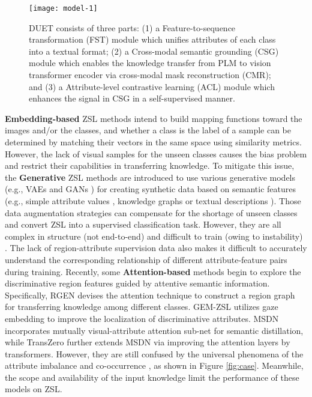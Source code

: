 \documentclass[letterpaper]{article} \usepackage{aaai23}  \usepackage{times}  \usepackage{helvet}  \usepackage{courier}  \usepackage[hyphens]{url}  \usepackage{graphicx} \urlstyle{rm} \def\UrlFont{\rm}  \usepackage{natbib}  \usepackage{caption} \frenchspacing  \setlength{\pdfpagewidth}{8.5in}  \setlength{\pdfpageheight}{11in}  \usepackage{algorithm}
\newcommand{\wen}[1]{{\color{black}#1}}
\newcommand{\fy}[1]{{\color{black}#1}}
\begin{document}
\begin{figure*}[!htbp]
\vspace{-2pt}
  \centering
  \texttt{[image: model-1]}
  \vspace{-2pt}
  \caption{
  \wen{DUET consists of three parts: (1) {a} {{Feature-to-sequence transformation (FST) module}} which unifies 
attributes of each class 
into a textual format; 
(2) {a} {{Cross-modal semantic grounding (CSG) module}} which enables the knowledge transfer from PLM to vision transformer encoder via cross-modal mask reconstruction (CMR);
and (3) a {{Attribute-level contrastive learning (ACL) module}} which enhances the signal in CSG in a self-supervised manner.}}
  \vspace{-10pt}
  \label{fig:model}
\end{figure*}
\textbf{Embedding-based} \wen{ZSL}
methods \cite{DBLP:conf/nips/FromeCSBDRM13} \fy{intend} to build mapping functions toward the images and/or the classes, 
and whether a class is the label of a sample can be determined by matching their vectors in the same space using similarity metrics.
However, the lack of visual samples for the unseen classes causes the bias problem and restrict their capabilities in transferring knowledge. 
To mitigate this issue, the  \textbf{Generative} ZSL methods \cite{Chen2021HSVA,DBLP:conf/iccv/0002WXPYZ021,DBLP:conf/www/GengC0PYYJC21} are introduced to use  various generative models (e.g., VAEs and GANs ) for creating synthetic data based on semantic features (e.g., simple attribute values \cite{DBLP:conf/cvpr/NaeemXTA21}, knowledge graphs \cite{PVGW2017,DBLP:conf/www/GengC0PYYJC21} or textual descriptions \cite{DBLP:conf/mir/ChenY21}). 
Those data augmentation strategies can compensate for the shortage of unseen classes and convert ZSL into a supervised classiﬁcation task. 
However, they are all complex in structure (not end-to-end) and difficult to train (owing to instability) \cite{DBLP:journals/corr/abs-2011-08641}.
\fy{The lack of} region-attribute supervision data also makes it difficult to accurately understand the corresponding relationship of different attribute-feature pairs during training. 
Recently, some \textbf{Attention-based} methods begin to explore the discriminative region features \fy{guided by} attentive semantic information.
Specifically, 
RGEN  \cite{DBLP:conf/eccv/Xie0ZZZYQ020} \fy{devises} the attention technique to 
construct a region graph for transferring knowledge among different classes.
GEM-ZSL \cite{DBLP:conf/cvpr/Liu00H00H21} utilize{s} gaze embedding to improve the localization of discriminative attributes.
MSDN \cite{Chen2022MSDN} incorporates mutually visual-attribute attention sub-net for semantic distillation, while TransZero \cite{Chen2021TransZero} further extend{s} MSDN via {improving the attention layers by transformers.}
However, they are still confused by the universal phenomena of
the attribute imbalance 
and co-occurrence \cite{DBLP:conf/cvpr/ZhaoFLWWW19,DBLP:conf/cvpr/WangHLXY021}, as shown in Figure \ref{fig:case}.
Meanwhile, the scope and availability of the input knowledge limit the performance of these models on ZSL. 
\end{document}
